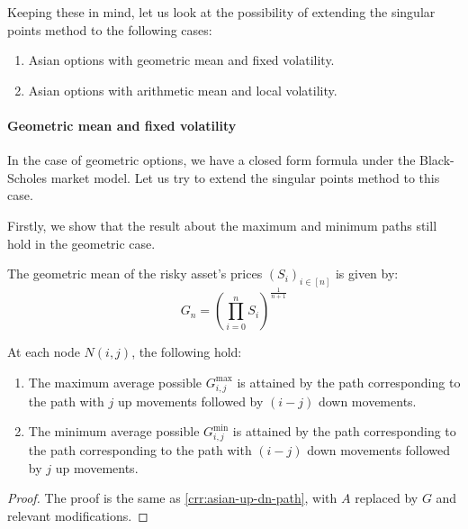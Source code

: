 Keeping these in mind, let us look at the possibility of extending the singular points method to the following cases:
\begin{enumerate}
	\item Asian options with geometric mean and fixed volatility.
	\item Asian options with arithmetic mean and local volatility.
\end{enumerate}



\paragraph{Geometric mean and fixed volatility}
In the case of geometric options, we have a closed form formula under the Black-Scholes market model. Let us try to extend the singular points method to this case.

Firstly, we show that the result about the maximum and minimum paths still hold in the geometric case.

\begin{dfn}
	The geometric mean of the risky asset's prices $ (S_i)_{i \in [n]} $ is given by:
	\begin{equation}
		\label{eq:gm}
		G_{n} = \left( \prod_{i=0}^n S_i \right) ^{\frac{1}{n+1}}
	\end{equation}
\end{dfn}


\begin{lmm}
	At each node $N(i,j)$, the following hold:
	\begin{enumerate}
	\item The maximum average possible $ G_{i,j}^{\max} $ is attained by the path corresponding to the path with $j$ up movements followed by $(i-j)$ down movements.
	\item The minimum average possible $ G_{i,j}^{\min} $ is attained by the path corresponding to the path corresponding to the path with $(i-j)$ down movements followed by $j$ up movements.
	\end{enumerate}
\end{lmm}

\begin{proof}
	The proof is the same as \ref{crr:asian-up-dn-path}, with $A$ replaced by $G$ and relevant modifications.
\end{proof}


